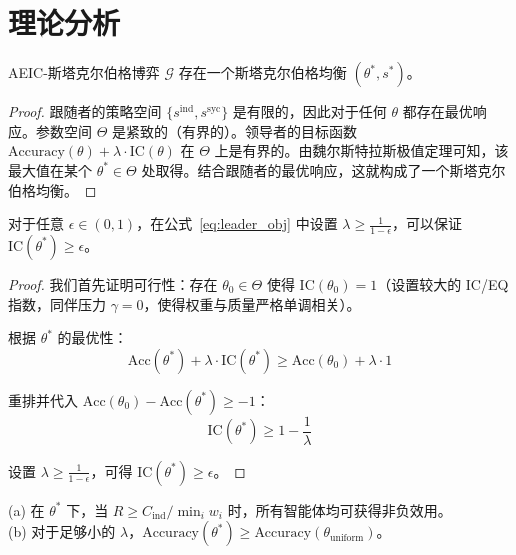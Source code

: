 \section{理论分析}
\label{sec:theory}

\begin{theorem}[斯塔克尔伯格均衡的存在性]
\label{thm:existence}
AEIC-斯塔克尔伯格博弈 $\mathcal{G}$ 存在一个斯塔克尔伯格均衡 $(\theta^*, s^*)$。
\end{theorem}

\begin{proof}
跟随者的策略空间 $\{s^{\text{ind}}, s^{\text{syc}}\}$ 是有限的，因此对于任何 $\theta$ 都存在最优响应。参数空间 $\Theta$ 是紧致的（有界的）。领导者的目标函数 $\text{Accuracy}(\theta) + \lambda \cdot \text{IC}(\theta)$ 在 $\Theta$ 上是有界的。由魏尔斯特拉斯极值定理可知，该最大值在某个 $\theta^* \in \Theta$ 处取得。结合跟随者的最优响应，这就构成了一个斯塔克尔伯格均衡。
\end{proof}

\begin{theorem}
\label{thm:ic}
对于任意 $\epsilon \in (0,1)$，在公式~\eqref{eq:leader_obj} 中设置 $\lambda \geq \frac{1}{1-\epsilon}$，可以保证 $\text{IC}(\theta^*) \geq \epsilon$。
\end{theorem}

\begin{proof}
我们首先证明可行性：存在 $\theta_0 \in \Theta$ 使得 $\text{IC}(\theta_0) = 1$（设置较大的 IC/EQ 指数，同伴压力 $\gamma = 0$，使得权重与质量严格单调相关）。

根据 $\theta^*$ 的最优性：
\begin{equation}
    \text{Acc}(\theta^*) + \lambda \cdot \text{IC}(\theta^*) \geq \text{Acc}(\theta_0) + \lambda \cdot 1
\end{equation}

重排并代入 $\text{Acc}(\theta_0) - \text{Acc}(\theta^*) \geq -1$：
\begin{equation}
    \text{IC}(\theta^*) \geq 1 - \frac{1}{\lambda}
\end{equation}

设置 $\lambda \geq \frac{1}{1-\epsilon}$，可得 $\text{IC}(\theta^*) \geq \epsilon$。
\end{proof}

\begin{theorem}[个体理性与福利]
\label{thm:ir}
(a) 在 $\theta^*$ 下，当 $R \geq C_{\text{ind}} / \min_i w_i$ 时，所有智能体均可获得非负效用。 \\
(b) 对于足够小的 $\lambda$，$\text{Accuracy}(\theta^*) \geq \text{Accuracy}(\theta_{\text{uniform}})$。
\end{theorem}

